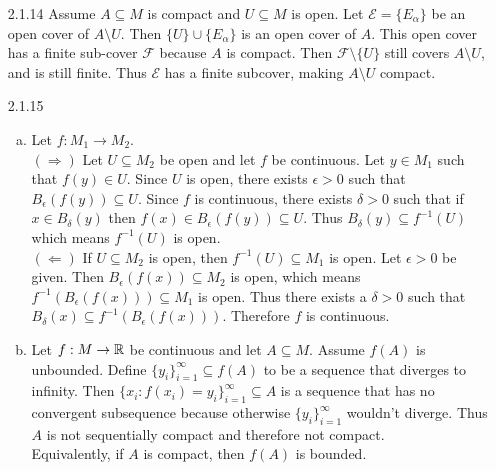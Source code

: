 \documentclass[../../Solutions.tex]{subfiles}
\begin{document}
\begin{itemize}
	\item [2.1.14] Assume $A \subseteq M$ is compact and $U \subseteq M$ is open.
		Let $\mathcal{E} = \{E_\alpha\}$ be an open cover of $A \setminus U$.
		Then $\{U\} \cup \{E_\alpha\}$ is an open cover of $A$.
		This open cover has a finite sub-cover $\mathcal{F}$ because $A$ is compact.
		Then $\mathcal{F} \setminus \{U\}$ still covers $A \setminus U$, and is still finite.
		Thus $\mathcal{E}$ has a finite subcover, making $A \setminus U$ compact.
		
	\item [2.1.15]
	\begin{enumerate}[(a)]
		\item Let $f:M_1 \to M_2$. \\
			$(\Rightarrow)$ Let $U \subseteq M_2$ be open and let $f$ be continuous.
			Let $y \in M_1$ such that $f(y) \in U$.
			Since $U$ is open, there exists $\epsilon > 0$ such that $B_\epsilon(f(y)) \subseteq U$.
			Since $f$ is continuous, there exists $\delta > 0$ such that if $x \in B_\delta(y)$ then $f(x) \in B_\epsilon(f(y)) \subseteq U$.
			Thus $B_\delta(y) \subseteq f^{-1}(U)$ which means $f^{-1}(U)$ is open. \\
			$(\Leftarrow)$ If $U \subseteq M_2$ is open, then $f^{-1}(U) \subseteq M_1$ is open.
			Let $\epsilon > 0$ be given.
			Then $B_\epsilon(f(x)) \subseteq M_2$ is open, which means $f^{-1}(B_\epsilon(f(x))) \subseteq M_1$ is open.
			Thus there exists a $\delta > 0$ such that $B_\delta(x) \subseteq f^{-1}(B_\epsilon(f(x)))$.
			Therefore $f$ is continuous.
		\item Let $f:M \to \mathbb{R}$ be continuous and let $A \subseteq M$.
			Assume $f(A)$ is unbounded.
			Define $\{y_i\}_{i=1}^\infty \subseteq f(A)$ to be a sequence that diverges to infinity.
			Then $\{x_i:f(x_i) = y_i\}_{i=1}^\infty \subseteq A$ is a sequence that has no convergent subsequence because otherwise $\{y_i\}_{i=1}^\infty$ wouldn't diverge.
			Thus $A$ is not sequentially compact and therefore not compact. \\
			Equivalently, if $A$ is compact, then $f(A)$ is bounded.
	\end{enumerate}
		
\end{itemize}
\end{document}

